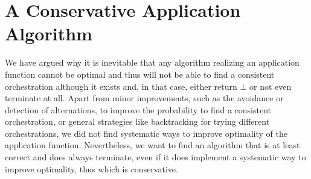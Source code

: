 

\section{A Conservative Application Algorithm}

We have argued why it is inevitable that any algorithm realizing an application function cannot be optimal and thus will not be able to find a consistent orchestration although it exists and, in that case, either return $\bot$ or not even terminate at all.
Apart from minor improvements, such as the avoidance or detection of alternations, to improve the probability to find a consistent orchestration, or general strategies like backtracking for trying different orchestrations, we did not find systematic ways to improve optimality of the application function.
Nevertheless, we want to find an algorithm that is at least correct and does always terminate, even if it does implement a systematic way to improve optimality, thus which is conservative.

